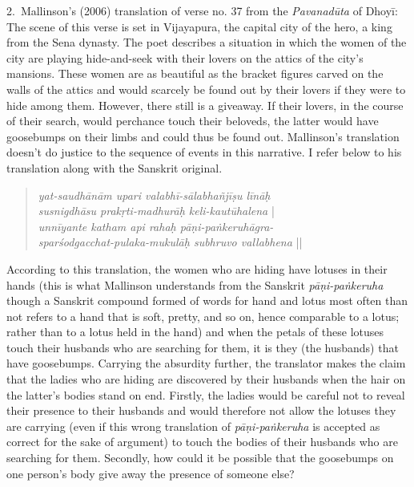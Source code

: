 2.~Mallinson’s (2006) translation of verse no. 37 from the \textsl{Pavanadūta} of Dhoyī:  The scene of this verse is set in Vijayapura, the capital city of the hero, a king from the Sena dynasty. The poet describes a situation in which the women of the city are playing hide-and-seek with their lovers on the attics of the city's mansions. These women are as beautiful as the bracket figures carved on the walls of the attics and would scarcely be found out by their lovers if they were to hide among them. However, there still is a giveaway. If their lovers, in the course of their search, would perchance touch their beloveds, the latter would have goosebumps on their limbs and could thus be found out. Mallinson's translation doesn't do justice to the sequence of events in this narrative. I refer below to his translation along with the Sanskrit original.
\begin{quote}
\textsl{yat-saudhānām upari valabhī-sālabhañjīṣu līnāḥ}\\
\textsl{susnigdhāsu prakṛti-madhurāḥ keli-kautūhalena} |\\
\textsl{unnīyante katham api rahaḥ pāṇi-paṅkeruhāgra-}\\
\textsl{sparśodgacchat-pulaka-mukulāḥ subhruvo vallabhena} ||
\end{quote}

\newpage


According to this translation, the women who are hiding have lotuses in their hands (this is what Mallinson understands from the Sanskrit \textsl{pāṇi-paṅkeruha} though a Sanskrit compound formed of words for hand and lotus most often than not refers to a hand that is soft, pretty, and so on, hence comparable to a lotus; rather than to a lotus held in the hand) and when the petals of these lotuses touch their husbands who are searching for them, it is they (the husbands) that have goosebumps. Carrying the absurdity further, the translator makes the claim that the ladies who are hiding are discovered by their husbands when the hair on the latter's bodies stand on end. Firstly, the ladies would be careful not to reveal their presence to their husbands and would therefore not allow the lotuses they are carrying (even if this wrong translation of \textsl{pāṇi-paṅkeruha} is accepted as correct for the sake of argument) to touch the bodies of their husbands who are searching for them. Secondly, how could it be possible that the goosebumps on one person's body give away the presence of someone else? 

